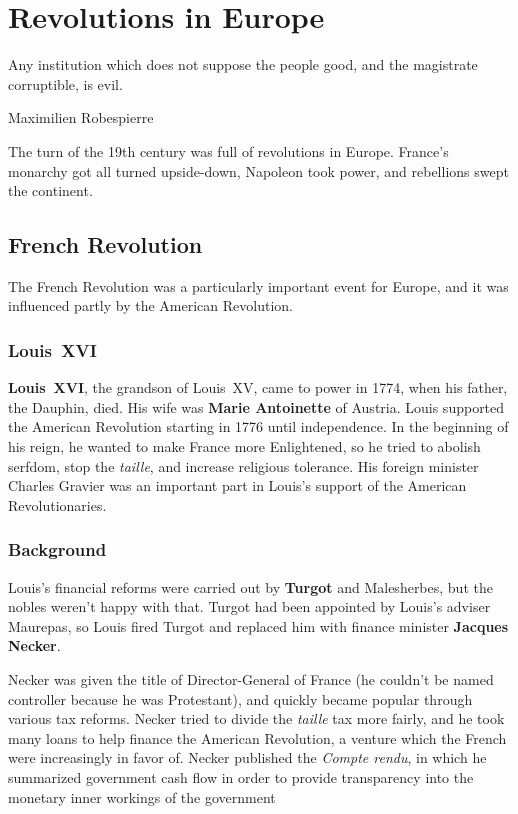 \chapter{Revolutions in Europe}

\epigraph{%
  Any institution which does not suppose the people good, and the magistrate corruptible, is evil.
}{Maximilien Robespierre}

The turn of the 19th century was full of revolutions in Europe.
France's monarchy got all turned upside-down, Napoleon took power, and rebellions swept the continent.

\section{French Revolution}

The French Revolution was a particularly important event for Europe,
and it was influenced partly by the American Revolution.

\subsection*{Louis~XVI}

\textbf{Louis~XVI}, the grandson of Louis~XV,
came to power in 1774, when his father, the Dauphin, died.
His wife was \textbf{Marie Antoinette} of Austria.
Louis supported the American Revolution starting in 1776 until independence.
In the beginning of his reign, he wanted to make France more Enlightened,
so he tried to abolish serfdom, stop the \textit{taille}, and increase religious tolerance.
His foreign minister Charles Gravier
was an important part in Louis's support of the American Revolutionaries.

\subsection*{Background}

Louis's financial reforms were carried out by \textbf{Turgot} and Malesherbes,
but the nobles weren't happy with that.
Turgot had been appointed by Louis's adviser Maurepas,
so Louis fired Turgot and replaced him with finance minister \textbf{Jacques Necker}.

Necker was given the title of Director-General of France
(he couldn't be named controller because he was Protestant),
and quickly became popular through various tax reforms.
Necker tried to divide the \textit{taille} tax more fairly,
and he took many loans to help finance the American Revolution,
a venture which the French were increasingly in favor of.
Necker published the \textit{Compte rendu},
in which he summarized government cash flow in order to provide transparency
into the monetary inner workings of the government

